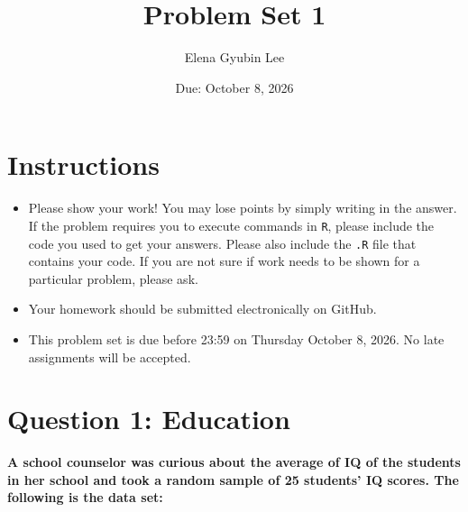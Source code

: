 \documentclass[12pt,letterpaper]{article}
\title{Problem Set 1}
\date{Due: October 8, 2026}
\author{Elena Gyubin Lee}
\begin{document}
	\maketitle
	
	\section*{Instructions}
	\begin{itemize}
	\item Please show your work! You may lose points by simply writing in the answer. If the problem requires you to execute commands in \texttt{R}, please include the code you used to get your answers. Please also include the \texttt{.R} file that contains your code. If you are not sure if work needs to be shown for a particular problem, please ask.
\item Your homework should be submitted electronically on GitHub.
\item This problem set is due before 23:59 on Thursday October 8, 2026. No late assignments will be accepted.
	\end{itemize}
	
	\vspace{1cm}
	\section*{Question 1: Education}

\textbf{A school counselor was curious about the average of IQ of the students in her school and took a random sample of 25 students' IQ scores. The following is the data set:}\\

\
\end{document}

